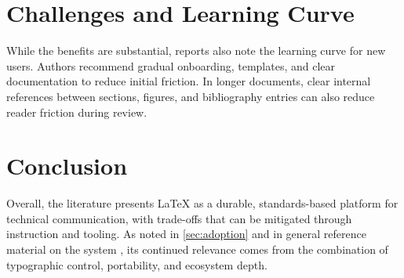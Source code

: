 \documentclass{article}
\begin{document}
\section{Challenges and Learning Curve}\label{sec:challenges}
While the benefits are substantial, reports also note the learning curve for
new users. Authors recommend gradual onboarding, templates, and clear
documentation to reduce initial friction. In longer documents, clear internal
references between sections, figures, and bibliography entries can also reduce
reader friction during review.

\section{Conclusion}\label{sec:conclusion}
Overall, the literature presents LaTeX as a durable, standards-based platform
for technical communication, with trade-offs that can be mitigated through
instruction and tooling. As noted in \autoref{sec:adoption} and in general
reference material on the system \cite{latexwiki}, its continued relevance comes
from the combination of typographic control, portability, and ecosystem depth.

\printbibliography
\end{document}
